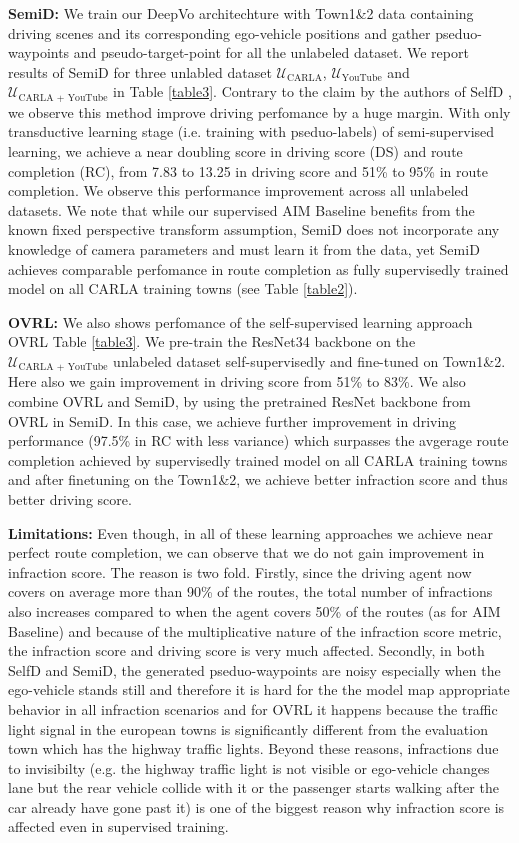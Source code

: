 \documentclass[12pt, letterpaper,cleardoubleempty,BCOR1cm]{scrbook}
\begin{document}
\textbf{SemiD:} We train our DeepVo architechture with Town1\&2 data containing driving
scenes and its corresponding ego-vehicle positions and gather pseduo-waypoints
and pseudo-target-point for all the unlabeled dataset. We report results of
SemiD for three unlabled dataset \(\mathcal{U}_{\text{CARLA}}\), \(\mathcal{U}_{\text{YouTube}}\)
and \(\mathcal{U}_{\text{CARLA + YouTube}}\) in Table \ref{table3}. Contrary to the claim
by the authors of SelfD \cite{Zhang2022a}, we observe this method improve
driving perfomance by a huge margin. With only transductive learning stage
(i.e. training with pseduo-labels) of semi-supervised learning, we achieve a
near doubling score in driving score (DS) and route completion (RC), from 7.83
to 13.25 in driving score and 51\% to 95\% in route completion. We observe this
performance improvement across all unlabeled datasets. We note that while our
supervised AIM Baseline benefits from the known fixed perspective transform
assumption, SemiD does not incorporate any knowledge of camera parameters and
must learn it from the data, yet SemiD achieves comparable perfomance in route
completion as fully supervisedly trained model on all CARLA training towns (see
Table \ref{table2}).

\textbf{OVRL:} We also shows perfomance of the self-supervised learning approach OVRL
Table \ref{table3}. We pre-train the ResNet34 backbone on the \(\mathcal{U}_{\text{CARLA +
YouTube}}\) unlabeled dataset self-supervisedly and fine-tuned on Town1\&2. Here
also we gain improvement in driving score from 51\% to 83\%. We also combine OVRL
and SemiD, by using the pretrained ResNet backbone from OVRL in SemiD. In this
case, we achieve further improvement in driving performance (97.5\% in RC with
less variance) which surpasses the avgerage route completion achieved by
supervisedly trained model on all CARLA training towns and after finetuning on
the Town1\&2, we achieve better infraction score and thus better driving score.

\textbf{Limitations:} Even though, in all of these learning approaches we achieve near
perfect route completion, we can observe that we do not gain improvement in
infraction score. The reason is two fold. Firstly, since the driving agent now
covers on average more than 90\% of the routes, the total number of infractions
also increases compared to when the agent covers 50\% of the routes (as for AIM
Baseline) and because of the multiplicative nature of the infraction score
metric, the infraction score and driving score is very much affected. Secondly,
in both SelfD and SemiD, the generated pseduo-waypoints are noisy especially
when the ego-vehicle stands still and therefore it is hard for the the model map
appropriate behavior in all infraction scenarios and for OVRL it happens because
the traffic light signal in the european towns is significantly different from
the evaluation town which has the highway traffic lights. Beyond these reasons,
infractions due to invisibilty (e.g. the highway traffic light is not visible or
ego-vehicle changes lane but the rear vehicle collide with it or the passenger
starts walking after the car already have gone past it) is one of the biggest
reason why infraction score is affected even in supervised training.
\end{document}
